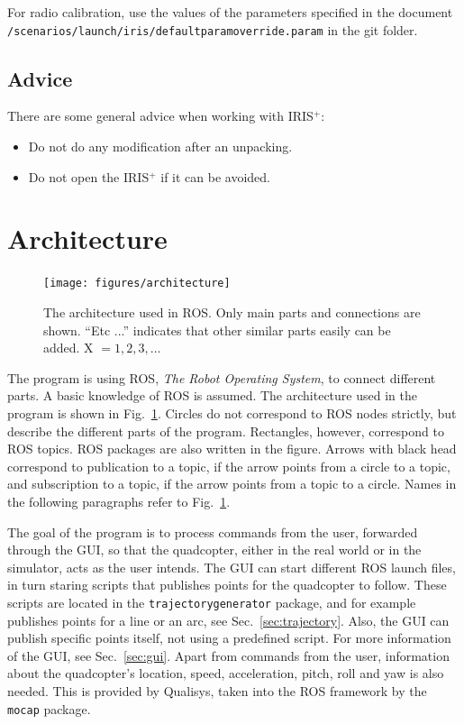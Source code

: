 \documentclass[titlepage,11pt,a4paper]{article}
\begin{document}
For radio calibration, use the values of the parameters specified in the document \texttt{/scenarios/launch/iris/default\textunderscore param\textunderscore override.param} in the git folder.

\subsection{Advice}
\label{subsec:advice}
There are some general advice when working with IRIS$^+$:

\begin{itemize}
  \item Do not do any modification after an unpacking.
  \item Do not open the IRIS$^+$ if it can be avoided.
\end{itemize}


\section{Architecture}
\label{sec:architecture}

\begin{figure}[h!]                                                               
  \centering \texttt{[image: figures/architecture]}
  \caption{The architecture used in ROS. Only main parts and
    connections are shown. ``Etc ...'' indicates that other similar
    parts easily can be added. X $= 1, 2, 3, \dots$}
  \label{fig:architecture}                                                              
\end{figure}

The program is using ROS, \textit{The Robot Operating System}, to
connect different parts. A basic knowledge of ROS is
assumed. The architecture used in the program is shown in
Fig.~\ref{fig:architecture}. Circles do not correspond to ROS nodes
strictly, but describe the different parts of the
program. Rectangles, however, correspond to ROS topics. ROS packages
are also written in the figure. Arrows with black head correspond to
publication to a topic, if the arrow points from a circle to a topic,
and subscription to a topic, if the arrow points from a topic to a
circle. Names in the following paragraphs refer to
Fig.~\ref{fig:architecture}.

The goal of the program is to process commands from the user,
forwarded through the GUI, so that the quadcopter, either in the real
world or in the simulator, acts as the user intends. The GUI can start
different ROS launch files, in turn staring scripts that publishes
points for the quadcopter to follow. These scripts are located in the
\texttt{trajectory\textunderscore generator} package, and for example
publishes points for a line or an arc, see
Sec.~\ref{sec:trajectory}. Also, the GUI can publish specific points
itself, not using a predefined script. For more information of the
GUI, see Sec.~\ref{sec:gui}. Apart from commands from the user,
information about the quadcopter's location, speed, acceleration,
pitch, roll and yaw is also needed. This is provided by Qualisys,
taken into the ROS framework by the \texttt{mocap} package.
\end{document}
